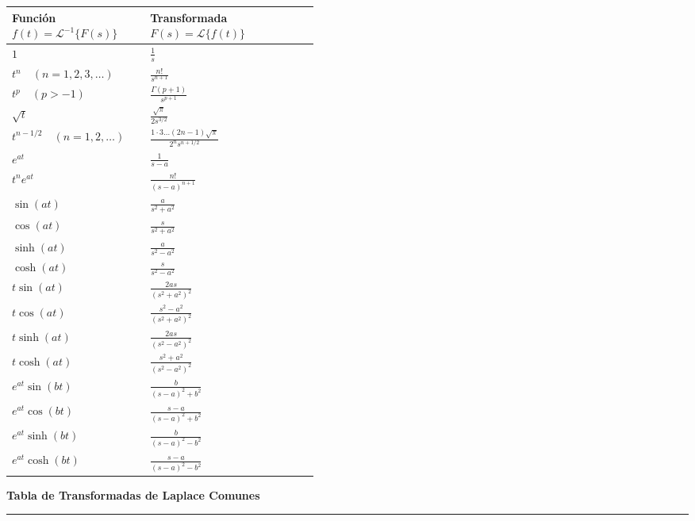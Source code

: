 \documentclass[10pt, landscape, twocolumn]{article}
\newcommand{\cheatsheetsection}[1]{
    \vspace{0.6em}
    {\color{themeblue}\large\bfseries #1} \par
    \vspace{-0.5em}
    {\color{themeblue}\rule{\linewidth}{1pt}} \par
    \vspace{0.2em}
}
\begin{document}
\begin{tabularx}{\linewidth}{|p{0.45\linewidth}|X|}
\hline
\textbf{Función $f(t) = \mathcal{L}^{-1}\{F(s)\}$} & \textbf{Transformada $F(s) = \mathcal{L}\{f(t)\}$} \\ \hline
$1$ & $\frac{1}{s}$ \\ \hline
$t^n \quad (n = 1,2,3,\dots)$ & $\frac{n!}{s^{n+1}}$ \\ \hline
$t^p \quad (p > -1)$ & $\frac{\Gamma(p+1)}{s^{p+1}}$ \\ \hline
$\sqrt{t}$ & $\frac{\sqrt{\pi}}{2s^{3/2}}$ \\ \hline
$t^{n-1/2} \quad (n = 1,2,\dots)$ & $\frac{1 \cdot 3 \dots (2n-1)\sqrt{\pi}}{2^n s^{n+1/2}}$ \\ \hline
$e^{at}$ & $\frac{1}{s-a}$ \\ \hline
$t^n e^{at}$ & $\frac{n!}{(s-a)^{n+1}}$ \\ \hline
$\sin(at)$ & $\frac{a}{s^2+a^2}$ \\ \hline
$\cos(at)$ & $\frac{s}{s^2+a^2}$ \\ \hline
$\sinh(at)$ & $\frac{a}{s^2-a^2}$ \\ \hline
$\cosh(at)$ & $\frac{s}{s^2-a^2}$ \\ \hline
$t \sin(at)$ & $\frac{2as}{(s^2+a^2)^2}$ \\ \hline
$t \cos(at)$ & $\frac{s^2-a^2}{(s^2+a^2)^2}$ \\ \hline
$t \sinh(at)$ & $\frac{2as}{(s^2-a^2)^2}$ \\ \hline
$t \cosh(at)$ & $\frac{s^2+a^2}{(s^2-a^2)^2}$ \\ \hline
$e^{at}\sin(bt)$ & $\frac{b}{(s-a)^2+b^2}$ \\ \hline
$e^{at}\cos(bt)$ & $\frac{s-a}{(s-a)^2+b^2}$ \\ \hline
$e^{at}\sinh(bt)$ & $\frac{b}{(s-a)^2-b^2}$ \\ \hline
$e^{at}\cosh(bt)$ & $\frac{s-a}{(s-a)^2-b^2}$ \\ \hline
\end{tabularx}

\newpage

\cheatsheetsection{Tabla de Transformadas de Laplace Comunes}
\vspace{0.5em}
\end{document}
